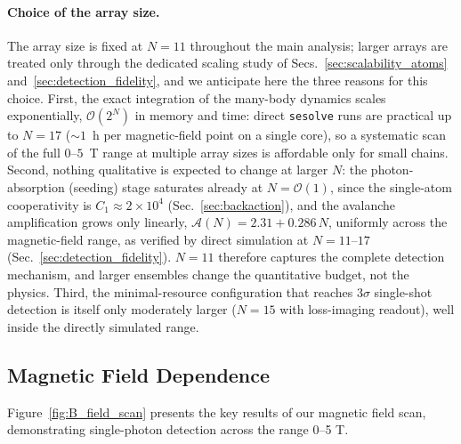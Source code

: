 \paragraph{Choice of the array size.}
The array size is fixed at $N = 11$ throughout the main analysis; larger
arrays are treated only through the dedicated scaling study of
Secs.~\ref{sec:scalability_atoms} and~\ref{sec:detection_fidelity}, and we
anticipate here the three reasons for this choice. First, the exact
integration of the many-body dynamics scales exponentially,
$\mathcal{O}(2^N)$ in memory and time: direct \texttt{sesolve} runs are
practical up to $N = 17$ ($\sim 1$~h per magnetic-field point on a single
core), so a systematic scan of the full $0$--$5$~T range at multiple array
sizes is affordable only for small chains. Second, nothing qualitative is
expected to change at larger $N$: the photon-absorption (seeding) stage
saturates already at $N = \mathcal{O}(1)$, since the single-atom
cooperativity is $C_1 \approx 2\times 10^{4}$
(Sec.~\ref{sec:backaction}), and the avalanche amplification grows only
linearly, $\mathcal{A}(N) = 2.31 + 0.286\,N$, uniformly across the
magnetic-field range, as verified by direct simulation at
$N = 11$--$17$ (Sec.~\ref{sec:detection_fidelity}). $N = 11$ therefore
captures the complete detection mechanism, and larger ensembles change the
quantitative budget, not the physics. Third, the minimal-resource
configuration that reaches $3\sigma$ single-shot detection is itself only
moderately larger ($N = 15$ with loss-imaging readout), well inside the
directly simulated range.

\subsection*{Magnetic Field Dependence}

Figure~\ref{fig:B_field_scan} presents the key results of our magnetic field scan, demonstrating single-photon detection across the range 0--5 T.

